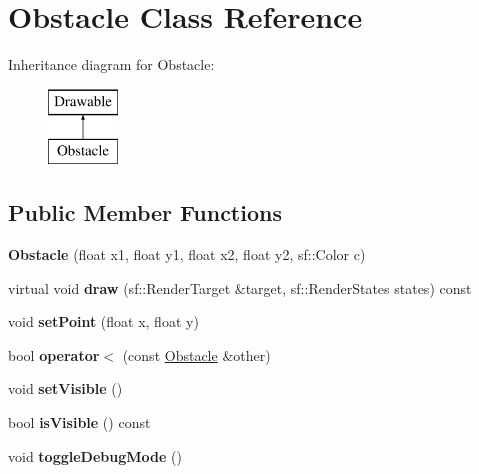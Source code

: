 \hypertarget{class_obstacle}{}\section{Obstacle Class Reference}
\label{class_obstacle}
Inheritance diagram for Obstacle\+:\begin{figure}[H]
\begin{center}
\leavevmode
\includegraphics[height=2.000000cm]{class_obstacle}
\end{center}
\end{figure}
\subsection*{Public Member Functions}
\begin{DoxyCompactItemize}
\item 
\mbox{\label{class_obstacle_aaded15a33e60984e25e24f0defa50870}} 
{\bfseries Obstacle} (float x1, float y1, float x2, float y2, sf\+::\+Color c)
\item 
\mbox{\label{class_obstacle_ab0f2a99b3600ac11ae0247c90f64c071}} 
virtual void {\bfseries draw} (sf\+::\+Render\+Target \&target, sf\+::\+Render\+States states) const
\item 
\mbox{\label{class_obstacle_aa4176e81a3e9d34ebeaf7b44b9080820}} 
void {\bfseries set\+Point} (float x, float y)
\item 
\mbox{\label{class_obstacle_a3ae1362463a63cd00635013d66f3bcb2}} 
bool {\bfseries operator$<$} (const \mbox{\hyperlink{class_obstacle}{Obstacle}} \&other)
\item 
\mbox{\label{class_obstacle_afe9cbf384d3989c1767c04ef9f372ead}} 
void {\bfseries set\+Visible} ()
\item 
\mbox{\label{class_obstacle_a81906856ac119daa74363867d81462ad}} 
bool {\bfseries is\+Visible} () const
\item 
\mbox{\label{class_obstacle_ab8ae38eb078cfd5872005e901a02c8af}} 
void {\bfseries toggle\+Debug\+Mode} ()
\end{DoxyCompactItemize}

